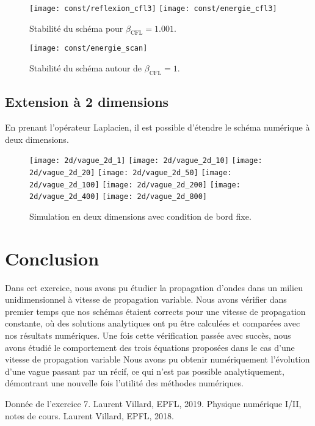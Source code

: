 \documentclass[a4paper,12pt,oneside]{article}
\begin{document}
\begin{figure}[H]
    \centering
    \texttt{[image: const/reflexion\_cfl3]}
    \texttt{[image: const/energie\_cfl3]}
    \caption{Stabilité du schéma pour $\beta_\text{CFL}=1.001$.}
    \label{fig:cfl3}
\end{figure}

\begin{figure}[H]
    \centering
    \texttt{[image: const/energie\_scan]}
    \caption{Stabilité du schéma autour de $\beta_\text{CFL}=1$.}
    \label{fig:cfl_scan}
\end{figure}

\subsection{Extension à 2 dimensions}
En prenant l'opérateur Laplacien, il est possible d'étendre le schéma numérique à deux dimensions. 

\begin{figure}[H]
    \centering
    \texttt{[image: 2d/vague\_2d\_1]}
    \texttt{[image: 2d/vague\_2d\_10]}
    \texttt{[image: 2d/vague\_2d\_20]}
    \texttt{[image: 2d/vague\_2d\_50]}
    \texttt{[image: 2d/vague\_2d\_100]}
    \texttt{[image: 2d/vague\_2d\_200]}
    \texttt{[image: 2d/vague\_2d\_400]}
    \texttt{[image: 2d/vague\_2d\_800]}
    \caption{Simulation en deux dimensions avec condition de bord fixe.}
    \label{fig:cfl_scan}
\end{figure}

\section{Conclusion}
Dans cet exercice, nous avons pu étudier la propagation d'ondes dans un milieu unidimensionnel à vitesse de propagation variable. Nous avons vérifier dans premier temps que nos schémas étaient corrects pour une vitesse de propagation constante, où des solutions analytiques ont pu être calculées et comparées avec nos résultats numériques. Une fois cette vérification passée avec succès, nous avons étudié le comportement des trois équations proposées dans le cas d'une vitesse de propagation variable Nous avons pu obtenir numériquement l'évolution d'une vague passant par un récif, ce qui n'est pas possible analytiquement, démontrant une nouvelle fois l'utilité des méthodes numériques.


\begin{thebibliography}{99}
Donnée de l'exercice 7. Laurent Villard, EPFL, 2019.
Physique numérique I/II, notes de cours. Laurent Villard, EPFL, 2018.
\end{thebibliography}
\end{document}
